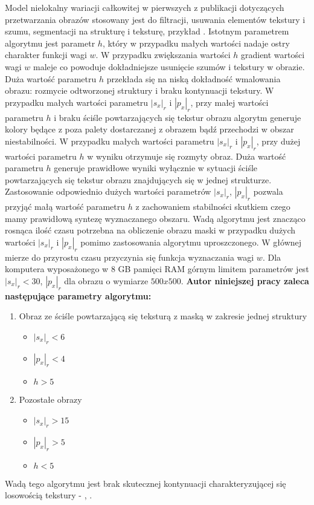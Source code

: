 \documentclass[12pt, twoside, openany]{report}
\theoremstyle{definition}
\begin{document}
Model nielokalny wariacji całkowitej w pierwszych z publikacji dotyczących przetwarzania obrazów stosowany jest do filtracji, usuwania elementów tekstury i szumu, segmentacji na strukturę i teksturę, przykład \cite{buades2005non}. Istotnym parametrem algorytmu jest parametr $h$, który w przypadku małych wartości nadaje ostry charakter funkcji wagi $w$. W przypadku zwiększania wartości $h$ gradient wartości wagi $w$ maleje co powoduje dokładniejsze usunięcie szumów i tekstury w obrazie. Duża wartość parametru $h$ przekłada się na niską dokładność wmalowania obrazu: rozmycie odtworzonej struktury i braku kontynuacji tekstury. W przypadku małych wartości parametru $|s_x|_r$ i $|p_x|_r$, przy małej wartości parametru $h$ i braku ściśle powtarzających się tekstur obrazu algorytm generuje kolory będące z poza palety dostarczanej z obrazem bądź przechodzi w obszar niestabilności. W przypadku małych wartości parametru  $|s_x|_r$ i $|p_x|_r$, przy dużej wartości parametru $h$ w wyniku otrzymuje się rozmyty obraz. Duża wartość parametru $h$ generuje prawidłowe wyniki wyłącznie w sytuacji ściśle powtarzających się tekstur obrazu znajdujących się w jednej strukturze. Zastosowanie odpowiednio dużych wartości parametrów $|s_x|_r$, $|p_x|_r$ pozwala przyjąć małą wartość parametru $h$ z zachowaniem stabilności skutkiem czego mamy prawidłową syntezę wyznaczanego obszaru. Wadą algorytmu jest znacząco rosnąca ilość czasu potrzebna na obliczenie obrazu maski w przypadku dużych wartości $|s_x|_r$ i $|p_x|_r$ pomimo zastosowania algorytmu uproszczonego. W głównej mierze do przyrostu czasu przyczynia się funkcja wyznaczania wagi $w$. Dla komputera wyposażonego w 8 GB pamięci RAM górnym limitem parametrów jest $|s_x|_r <30$, $|p_x|_r$ dla obrazu o wymiarze $500x500$. \textbf{Autor niniejszej pracy zaleca następujące parametry algorytmu:}
\begin{enumerate}
\item Obraz ze ściśle powtarzającą się teksturą z maską w zakresie jednej struktury
\begin{itemize}
\item $|s_x|_r < 6$
\item $|p_x|_r < 4$
\item $h > 5$
\end{itemize}
\item Pozostałe obrazy
\begin{itemize}
\item $|s_x|_r > 15$
\item $|p_x|_r > 5$
\item $h < 5$
\end{itemize}
\end{enumerate}
Wadą tego algorytmu jest brak skutecznej kontynuacji charakteryzującej się losowością tekstury - \kotmyszm, \ObrIm .
\end{document}
